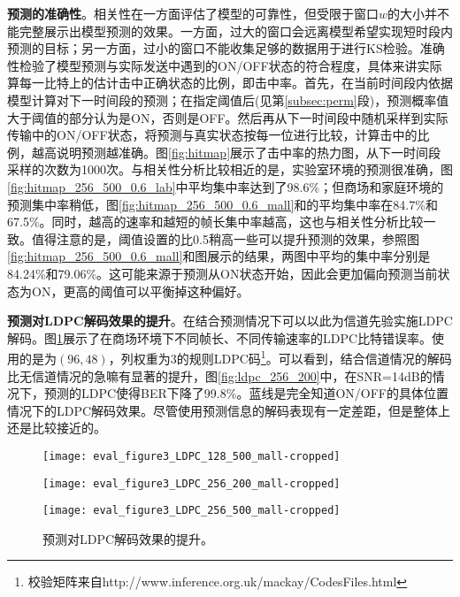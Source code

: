 \textbf{预测的准确性}。相关性在一方面评估了模型的可靠性，但受限于窗口$w$的大小并不能完整展示出模型预测的效果。一方面，过大的窗口会远离模型希望实现短时段内预测的目标；另一方面，过小的窗口不能收集足够的数据用于进行KS检验。准确性检验了模型预测与实际发送中遇到的ON/OFF状态的符合程度，具体来讲实际算每一比特上的估计击中正确状态的比例，即击中率。首先，在当前时间段内依据模型计算对下一时间段的预测；在指定阈值后(见第\ref{subsec:perm}段)，预测概率值大于阈值的部分认为是ON，否则是OFF。然后再从下一时间段中随机采样到实际传输中的ON/OFF状态，将预测与真实状态按每一位进行比较，计算击中的比例，越高说明预测越准确。图\ref{fig:hitmap}展示了击中率的热力图，从下一时间段采样的次数为1000次。与相关性分析比较相近的是，实验室环境的预测很准确，图\ref{fig:hitmap_256_500_0.6_lab}中平均集中率达到了98.6\%；但商场和家庭环境的预测集中率稍低，图\ref{fig:hitmap_256_500_0.6_mall}和的平均集中率在84.7\%和67.5\%。同时，越高的速率和越短的帧长集中率越高，这也与相关性分析比较一致。值得注意的是，阈值设置的比0.5稍高一些可以提升预测的效果，参照图\ref{fig:hitmap_256_500_0.6_mall}和图展示的结果，两图中平均的集中率分别是84.24\%和79.06\%。这可能来源于预测从ON状态开始，因此会更加偏向预测当前状态为ON，更高的阈值可以平衡掉这种偏好。

\textbf{预测对LDPC解码效果的提升}。在结合预测情况下可以以此为信道先验实施LDPC解码。图\ref{fig:ldpc}展示了在商场环境下不同帧长、不同传输速率的LDPC比特错误率。使用的是为$(96,48)$，列权重为$3$的规则LDPC码\footnote{校验矩阵来自http://www.inference.org.uk/mackay/CodesFiles.html}。可以看到，结合信道情况的解码比无信道情况的急嘛有显著的提升，图\ref{fig:ldpc_256_200}中，在SNR=14dB的情况下，预测的LDPC使得BER下降了99.8\%。蓝线是完全知道ON/OFF的具体位置情况下的LDPC解码效果。尽管使用预测信息的解码表现有一定差距，但是整体上还是比较接近的。
\begin{figure}[t]
	\begin{minipage}[b]{.32\linewidth}
		\texttt{[image: eval\_figure3\_LDPC\_128\_500\_mall-cropped]}
		\label{fig:ldpc_128_500}
	\end{minipage}
	\hfill
	\begin{minipage}[b]{.32\linewidth}
		\texttt{[image: eval\_figure3\_LDPC\_256\_200\_mall-cropped]}
		\label{fig:ldpc_256_200}
	\end{minipage}
	\hfill
	\begin{minipage}[b]{.32\linewidth}
		\texttt{[image: eval\_figure3\_LDPC\_256\_500\_mall-cropped]}
		\label{fig:ldpc_256_500}
	\end{minipage}
	\caption{预测对LDPC解码效果的提升。}\label{fig:ldpc}
\end{figure}

